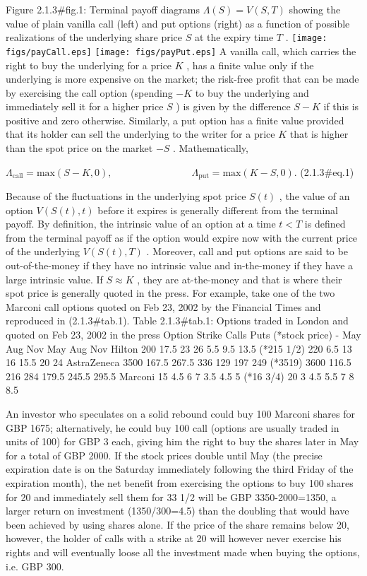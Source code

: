 \documentclass{beamer}
\begin{document}
\begin{frame}
Figure 2.1.3#fig.1: Terminal payoff diagrams  $ \Lambda (S)=V(S,T)$ showing the value of plain vanilla call (left) and put options (right) as a function of possible realizations of the underlying share price $ S$ at the expiry time $ T$ .
\texttt{[image: figs/payCall.eps]}        \texttt{[image: figs/payPut.eps]}
A vanilla call, which carries the right to buy the underlying for a price $ K$ , has a finite value only if the underlying is more expensive on the market; the risk-free profit that can be made by exercising the call option (spending  $ -K$ to buy the underlying and immediately sell it for a higher price $ S$ ) is given by the difference $ S-K$ if this is positive and zero otherwise. Similarly, a put option has a finite value provided that its holder can sell the underlying to the writer for a price $ K$ that is higher than the spot price on the market $ -S$ . Mathematically,

 $\displaystyle \Lambda_\mathrm{call}=\mathrm{max}(S-K,0), \qquad\qquad\qquad\qquad \Lambda_\mathrm{put}=\mathrm{max}(K-S,0).$	 (2.1.3#eq.1)

Because of the fluctuations in the underlying spot price $ S(t)$ , the value of an option $ V(S(t),t)$ before it expires is generally different from the terminal payoff. By definition, the intrinsic value of an option at a time $ t<T$ is defined from the terminal payoff as if the option would expire now with the current price of the underlying $ V(S(t),T)$ . Moreover, call and put options are said to be out-of-the-money if they have no intrinsic value and in-the-money if they have a large intrinsic value. If  $ S\approx K$ , they are at-the-money and that is where their spot price is generally quoted in the press. For example, take one of the two Marconi call options quoted on Feb 23, 2002 by the Financial Times and reproduced in (2.1.3#tab.1). 
Table 2.1.3#tab.1: Options traded in London and quoted on Feb 23, 2002 in the press
Option	 Strike	Calls	Puts
(*stock price)	 -	 May	 Aug	 Nov	 May	 Aug	 Nov
Hilton	 200	 17.5	 23	 26	 5.5	 9.5	 13.5
(*215 1/2)	 220	 6.5	 13	 16	 15.5	 20	 24
AstraZeneca	 3500	 167.5	 267.5	 336	 129	 197	 249
(*3519)	 3600	 116.5	 216	 284	 179.5	 245.5	 295.5
Marconi	 15	 4.5	 6	 7	 3.5	 4.5	 5
(*16 3/4)	 20	 3	 4.5	 5.5	 7	 8	 8.5

An investor who speculates on a solid rebound could buy 100 Marconi shares for GBP 1675; alternatively, he could buy 100 call (options are usually traded in units of 100) for GBP 3 each, giving him the right to buy the shares later in May for a total of GBP 2000. If the stock prices double until May (the precise expiration date is on the Saturday immediately following the third Friday of the expiration month), the net benefit from exercising the options to buy 100 shares for 20 and immediately sell them for 33 1/2 will be GBP 3350-2000=1350, a larger return on investment (1350/300=4.5) than the doubling that would have been achieved by using shares alone. If the price of the share remains below 20, however, the holder of calls with a strike at 20 will however never exercise his rights and will eventually loose all the investment made when buying the options, i.e. GBP 300.
\end{frame}
\end{document}
